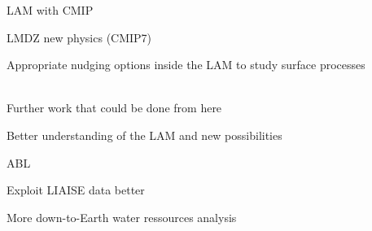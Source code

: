 LAM with CMIP

LMDZ new physics (CMIP7)

Appropriate nudging options inside the LAM to study surface processes

\hfill\\
Further work that could be done from here

Better understanding of the LAM and new possibilities

ABL

Exploit LIAISE data better

More down-to-Earth water ressources analysis
